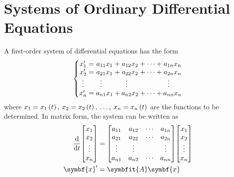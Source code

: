 \documentclass{article}
\begin{document}
\section{Systems of Ordinary Differential Equations}
A first-order system of differential equations has the form
\begin{equation*}
    \left\{
        \setlength\arraycolsep{0pt}
        \begin{array}{ c >{{}}c<{{}} c >{{}}c<{{}} c >{{}}c<{{}} c >{{}}c<{{}} c  }
        x'_1               &=& a_{11}x_1                         &+& a_{12}x_2                         &+& \cdots &+& a_{1n}x_n \\
        x'_2               &=& a_{21}x_1                         &+& a_{22}x_2                         &+& \cdots &+& a_{2n}x_n \\
        \vdotswithin{x'_3} & & \vdotswithin{a_{31}}\phantom{x_1} & & \vdotswithin{a_{32}}\phantom{x_2} & &        & & \vdotswithin{a_{3n}}\phantom{x_n} \\ 
        x'_n               &=& a_{n1}x_1                         &+& a_{n2}x_2                         &+& \cdots &+& a_{nn}x_n 
        \end{array}
    \right.
\end{equation*}
where $x_1={x_1}\left({t}\right),\: x_2={x_2}\left({t}\right),\: \dots,\: x_n={x_n}\left({t}\right)$ are the 
functions to be determined. In matrix form, the system can be written as
\begin{align*}
    \dv{t}\mqty[x_1 \\ x_2 \\ \vdots \\ x_n] &= \mqty[
        a_{11} & a_{12} & \cdots & a_{1n} \\
        a_{21} & a_{22} & \cdots & a_{2n} \\
        \vdots & \vdots &        & \vdots \\
        a_{n1} & a_{n2} & \cdots & a_{nn}
    ] \mqty[x_1 \\ x_2 \\ \vdots \\ x_n] \\
    \symbf{x}' &= \symbfit{A} \symbf{x}
\end{align*}
\end{document}

